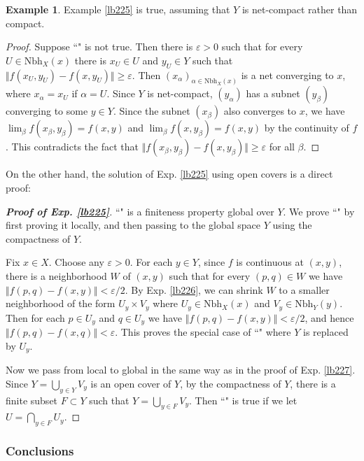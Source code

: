 \documentclass[12pt,b5paper,notitlepage]{article}
\theoremstyle{definition}
\newtheorem{eg}[df]{Example}
\theoremstyle{plain}
\newcommand{\Nbh}{\mathrm{Nbh}}
\newcommand{\eps}{\varepsilon}
\numberwithin{equation}{section}
\begin{document}
\begin{eg}
Example \ref{lb225} is true, assuming that $Y$ is net-compact rather than compact.
\end{eg}


\begin{proof}
Suppose ``\textleaf" is not true. Then there is $\eps>0$ such that for every $U\in\Nbh_X(x)$ there is $x_U\in U$ and $y_U\in Y$ such that $\Vert f(x_U,y_U)-f(x,y_U)\Vert\geq\eps$. Then $(x_\alpha)_{\alpha\in\Nbh_X(x)}$ is a net converging to $x$, where $x_\alpha=x_U$ if $\alpha=U$. Since $Y$ is net-compact, $(y_\alpha)$ has a subnet $(y_\beta)$ converging to  some $y\in Y$. Since the subnet $(x_\beta)$ also converges to $x$, we have $\lim_\beta f(x_\beta,y_\beta)=f(x,y)$ and $\lim_\beta f(x,y_\beta)=f(x,y)$ by the continuity of $f$. This contradicts the fact that $\Vert f(x_\beta,y_\beta)-f(x,y_\beta)\Vert\geq\eps$ for all $\beta$.
\end{proof}



On the other hand, the solution of Exp. \ref{lb225} using open covers is a direct proof:

\begin{proof}[\textbf{Proof of Exp. \ref{lb225}}]
``\textleaf" is a finiteness property global over $Y$. We prove ``\textleaf" by first proving it locally, and then passing to the global space $Y$ using the compactness of $Y$.

Fix $x\in X$. Choose any $\eps>0$. For each $y\in Y$, since $f$ is continuous at $(x,y)$, there is a neighborhood $W$ of $(x,y)$ such that for every $(p,q)\in W$ we have $\Vert f(p,q)-f(x,y)\Vert<\eps/2$. By Exp. \ref{lb226}, we can shrink $W$ to a smaller neighborhood of the form $U_y\times V_y$ where $U_y\in\Nbh_X(x)$ and $V_y\in\Nbh_Y(y)$. Then for each $p\in U_y$ and $q\in U_y$ we have $\Vert f(p,q)-f(x,y)\Vert<\eps/2$, and hence $\Vert f(p,q)-f(x,q)\Vert<\eps$. This proves the special case of ``\textleaf" where $Y$ is replaced by $U_y$.

Now we pass from local to global in the same way as in the proof of Exp. \ref{lb227}. Since $Y=\bigcup_{y\in Y}V_y$ is an open cover of $Y$, by the compactness of $Y$, there is a finite subset $F\subset Y$ such that $Y=\bigcup_{y\in F}V_y$. Then ``\textleaf" is true if we let $U=\bigcap_{y\in F}U_y$.
\end{proof}


\subsubsection{Conclusions}
\end{document}
